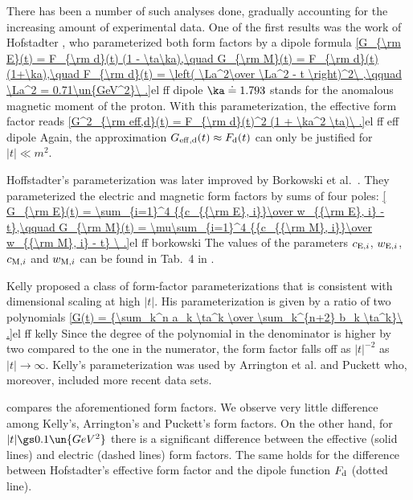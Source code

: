 There has been a number of such analyses done, gradually accounting for the increasing amount of experimental data. One of the first results was the work of Hofstadter , who parameterized both form factors by a dipole formula
\eqref{G_{\rm E}(t) = F_{\rm d}(t) (1 - \ta\ka),\quad G_{\rm M}(t) = F_{\rm d}(t) (1+\ka),\quad F_{\rm d}(t) = \left( \La^2\over \La^2 - t \right)^2\ ,\qquad \La^2 = 0.71\un{GeV^2}\ .}{el ff dipole}
$\ka\doteq 1.793$ stands for the anomalous magnetic moment of the proton. With this parameterization, the effective form factor reads
\eqref{G^2_{\rm eff,d}(t) = F_{\rm d}(t)^2 (1 + \ka^2 \ta)\ .}{el ff eff dipole}
Again, the approximation $G_{\rm eff,d}(t)\approx F_{\rm d}(t)$ can only be justified for $|t| \ll m^2$.

Hoffstadter's parameterization was later improved by Borkowski et al.~. They parameterized the electric and magnetic form factors by sums of four poles:
\eqref{
G_{\rm E}(t) = \sum_{i=1}^4 {{c_{{\rm E}, i}}\over w_{{\rm E}, i} - t},\qquad
G_{\rm M}(t) = \mu\sum_{i=1}^4 {{c_{{\rm M}, i}}\over w_{{\rm M}, i} - t}
\ .}{el ff borkowski}
The values of the parameters $c_{{\rm E}, i}$, $w_{{\rm E}, i}$, $c_{{\rm M}, i}$ and $w_{{\rm M}, i}$ can be found in Tab.~4 in .

Kelly  proposed a class of form-factor parameterizations that is consistent with dimensional scaling at high $|t|$. His parameterization is given by a ratio of two polynomials
\eqref{G(t) = {\sum_k^n a_k \ta^k \over \sum_k^{n+2} b_k \ta^k}\ .}{el ff kelly}
Since the degree of the polynomial in the denominator is higher by two compared to the one in the numerator, the form factor falls off as $|t|^{-2}$ as $|t|\to\infty$. Kelly's parameterization was used by Arrington et al.  and Puckett  who, moreover, included more recent data sets.

 compares the aforementioned form factors. We observe very little difference among Kelly's, Arrington's and Puckett's form factors. On the other hand, for $|t| \gs 0.1\un{GeV^2}$ there is a significant difference between the effective (solid lines) and electric (dashed lines) form factors. The same holds for the difference between Hofstadter's effective form factor and the dipole function $F_{\rm d}$ (dotted line).


